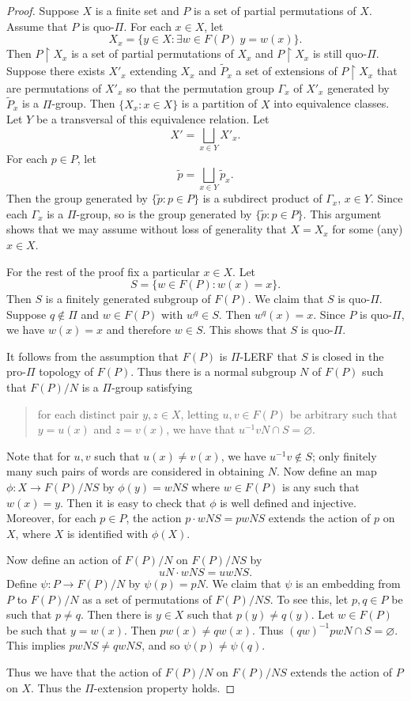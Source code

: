 \documentclass[11pt]{amsart}
\theoremstyle{definition}
\theoremstyle{definition}
\numberwithin{equation}{section}
\begin{document}
\begin{proof} Suppose $X$ is a finite set and $P$ is a set of partial permutations of $X$. Assume that $P$ is quo-$\Pi$. For each $x\in X$, let
$$ X_x=\{y\in X\colon \exists w\in F(P)\ y=w(x)\}. $$
Then $P\upharpoonright X_x$ is a set of partial permutations of $X_x$ and $P\upharpoonright X_x$ is still quo-$\Pi$. Suppose there exists $X'_x$ extending $X_x$ and $\tilde{P}_x$ a set of extensions of $P\upharpoonright X_x$ that are permutations of $X'_x$ so that the permutation group $\Gamma_x$ of $X'_x$ generated by $\tilde{P}_x$ is a $\Pi$-group. Then $\{X_x\colon x\in X\}$ is a partition of $X$ into equivalence classes. Let $Y$ be a transversal of this equivalence relation. Let 
$$ X'=\bigsqcup_{x\in Y} X'_x. $$
For each $p\in P$, let 
$$ \tilde{p}=\bigsqcup_{x\in Y} \tilde{p}_x. $$
Then the group generated by $\{\tilde{p}\colon p\in P\}$ is a subdirect product of $\Gamma_x$, $x\in Y$. Since each $\Gamma_x$ is a $\Pi$-group, so is the group generated by $\{\tilde{p}\colon p\in P\}$. This argument shows that we may assume without loss of generality that $X=X_x$ for some (any) $x\in X$.

For the rest of the proof fix a particular $x\in X$. Let
$$ S=\{w\in F(P)\colon w(x)=x\}. $$
Then $S$ is a finitely generated subgroup of $F(P)$. We claim that $S$ is quo-$\Pi$. Suppose $q\not\in \Pi$ and $w\in F(P)$ with $w^q\in S$. Then $w^q(x)=x$. Since $P$ is quo-$\Pi$, we have $w(x)=x$ and therefore $w\in S$. This shows that $S$ is quo-$\Pi$. 

It follows from the assumption that $F(P)$ is $\Pi$-LERF that $S$ is closed in the pro-$\Pi$ topology of $F(P)$. Thus there is a normal subgroup $N$ of $F(P)$ such that $F(P)/N$ is a $\Pi$-group satisfying 
\begin{quote}
for each distinct pair $y, z\in X$, letting $u, v\in F(P)$ be arbitrary such that $y=u(x)$ and $z=v(x)$, we have that $u^{-1}vN\cap S=\varnothing$.
\end{quote} 
Note that for $u, v$ such that $u(x)\neq v(x)$, we have $u^{-1}v\not\in S$; only finitely many such pairs of words are considered in obtaining $N$. Now define an map $\phi\colon X\to F(P)/NS$ by $\phi(y)=wNS$ where $w\in F(P)$ is any such that $w(x)=y$. Then it is easy to check that $\phi$ is well defined and injective. Moreover, for each $p\in P$, the action $p\cdot wNS=pwNS$ extends the action of $p$ on $X$, where $X$ is identified with $\phi(X)$. 

Now define an action of $F(P)/N$ on $F(P)/NS$ by
$$ uN\cdot wNS=uwNS. $$
Define $\psi\colon P\to F(P)/N$ by $\psi(p)=pN$. We claim that $\psi$ is an embedding from $P$ to $F(P)/N$ as a set of permutations of $F(P)/NS$. To see this, let $p, q\in P$ be such that $p\neq q$. Then there is $y\in X$ such that $p(y)\neq q(y)$. Let $w\in F(P)$ be such that $y=w(x)$. Then $pw(x)\neq qw(x)$. Thus $(qw)^{-1}pwN\cap S=\varnothing$. This implies $pwNS\neq qwNS$, and so $\psi(p)\neq \psi(q)$. 

Thus we have that the action of $F(P)/N$ on $F(P)/NS$ extends the action of $P$ on $X$. Thus the $\Pi$-extension property holds.
\end{proof}
\end{document}
